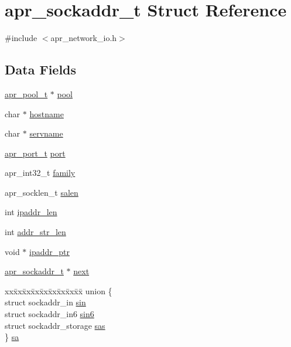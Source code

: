 \hypertarget{structapr__sockaddr__t}{}\section{apr\+\_\+sockaddr\+\_\+t Struct Reference}
\label{structapr__sockaddr__t}


{\ttfamily \#include $<$apr\+\_\+network\+\_\+io.\+h$>$}

\subsection*{Data Fields}
\begin{DoxyCompactItemize}
\item 
\hyperlink{group__apr__pools_gaf137f28edcf9a086cd6bc36c20d7cdfb}{apr\+\_\+pool\+\_\+t} $\ast$ \hyperlink{structapr__sockaddr__t_a5f2d72a6a181cf2f54ba7c922aa0dfab}{pool}
\item 
char $\ast$ \hyperlink{structapr__sockaddr__t_a8e675775b407f25674aaa938a40de9cd}{hostname}
\item 
char $\ast$ \hyperlink{structapr__sockaddr__t_a668335161a8347b9a34c600bff80b52f}{servname}
\item 
\hyperlink{group__apr__network__io_gaa670a71960f6eb4fe0d0de2a1e7aba03}{apr\+\_\+port\+\_\+t} \hyperlink{structapr__sockaddr__t_a174c19138de9c208f13ed71b5892e505}{port}
\item 
apr\+\_\+int32\+\_\+t \hyperlink{structapr__sockaddr__t_ac17f6e803928cfc29069a6e62dcb3a52}{family}
\item 
apr\+\_\+socklen\+\_\+t \hyperlink{structapr__sockaddr__t_aef1d2a482f85eeab7b6bf0a7732a087a}{salen}
\item 
int \hyperlink{structapr__sockaddr__t_a81be21b2eb968b83ca36183213c99867}{ipaddr\+\_\+len}
\item 
int \hyperlink{structapr__sockaddr__t_a8f7cda5562e904a1398ed5a4a6f0a9d9}{addr\+\_\+str\+\_\+len}
\item 
void $\ast$ \hyperlink{structapr__sockaddr__t_a6e1b71121ada4047acde36c6777b5442}{ipaddr\+\_\+ptr}
\item 
\hyperlink{structapr__sockaddr__t}{apr\+\_\+sockaddr\+\_\+t} $\ast$ \hyperlink{structapr__sockaddr__t_a774835c6b8e3adf255b752e8b126c434}{next}
\item 
\begin{tabbing}
xx\=xx\=xx\=xx\=xx\=xx\=xx\=xx\=xx\=\kill
union \{\\
\>struct sockaddr\_in \hyperlink{structapr__sockaddr__t_a7d5cf0290260c3c448360fc819b28714}{sin}\\
\>struct sockaddr\_in6 \hyperlink{structapr__sockaddr__t_ab3a1f900d2a1e58d337a61d99e94d3f9}{sin6}\\
\>struct sockaddr\_storage \hyperlink{structapr__sockaddr__t_ac823daa30be02ee1589b4b67615cef5f}{sas}\\
\} \hyperlink{structapr__sockaddr__t_a3ca40eae640100e0f157e7c21b33a17d}{sa}\\

\end{tabbing}\end{DoxyCompactItemize}


